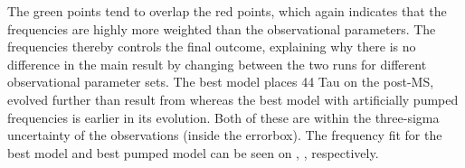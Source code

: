 The green points tend to overlap the red points, which again indicates that the frequencies are highly more weighted than the observational parameters. The frequencies thereby controls the final outcome, explaining why there is no difference in the main result by changing between the two runs for different observational parameter sets. 
The best model places 44 Tau on the post-MS, evolved further than result from \citet{lenz2010delta} whereas the best model with artificially pumped frequencies is earlier in its evolution. Both of these are within the three-sigma uncertainty of the observations (inside the errorbox). The frequency fit for the best model and best pumped model can be seen on , , respectively. 
 
